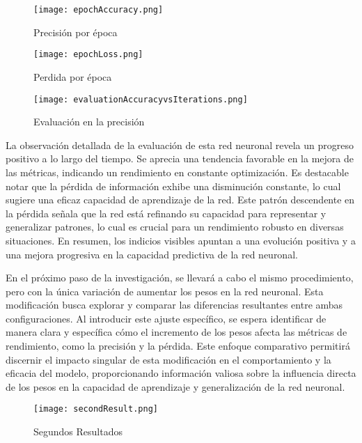   \begin{figure}[H]
    \centering
    \texttt{[image: epochAccuracy.png]}
    \caption{Precisión por época}
    \label{fig: epochAccuracy}
  \end{figure}

  \begin{figure}[H]
    \centering
    \texttt{[image: epochLoss.png]}
    \caption{Perdida por época}
    \label{fig: epochLoss}
  \end{figure}

  \begin{figure}[H]
    \centering
    \texttt{[image: evaluationAccuracyvsIterations.png]}
    \caption{Evaluación en la precisión}
    \label{fig: evaluationAccuracyvsIterations}
  \end{figure}

  La observación detallada de la evaluación de esta red neuronal revela un progreso positivo a lo largo del tiempo. Se aprecia una tendencia favorable en la mejora de las métricas, indicando un rendimiento en constante optimización. Es destacable notar que la pérdida de información exhibe una disminución constante, lo cual sugiere una eficaz capacidad de aprendizaje de la red. Este patrón descendente en la pérdida señala que la red está refinando su capacidad para representar y generalizar patrones, lo cual es crucial para un rendimiento robusto en diversas situaciones. En resumen, los indicios visibles apuntan a una evolución positiva y a una mejora progresiva en la capacidad predictiva de la red neuronal.

  En el próximo paso de la investigación, se llevará a cabo el mismo procedimiento, pero con la única variación de aumentar los pesos en la red neuronal. Esta modificación busca explorar y comparar las diferencias resultantes entre ambas configuraciones. Al introducir este ajuste específico, se espera identificar de manera clara y específica cómo el incremento de los pesos afecta las métricas de rendimiento, como la precisión y la pérdida. Este enfoque comparativo permitirá discernir el impacto singular de esta modificación en el comportamiento y la eficacia del modelo, proporcionando información valiosa sobre la influencia directa de los pesos en la capacidad de aprendizaje y generalización de la red neuronal.

  \begin{figure}[H]
    \centering
    \texttt{[image: secondResult.png]}
    \caption{Segundos Resultados}
    \label{fig: second result and time}
  \end{figure}

